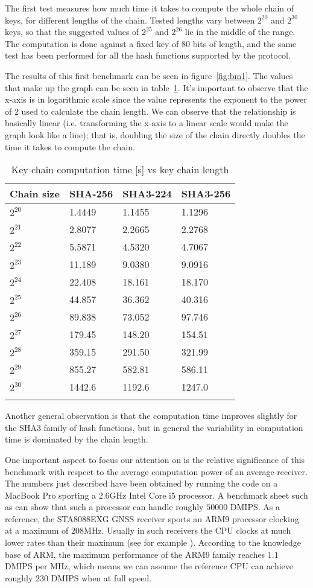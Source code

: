 \vspace{\baselineskip}

The first test measures how much time it takes to compute the whole chain of
keys, for different lengths of the chain. Tested lengths vary between $2^{20}$
and $2^{30}$ keys, so that the suggested values of $2^{25}$ and $2^{26}$ lie in
the middle of the range. The computation is done against a fixed key of $80$
bits of length, and the same test has been performed for all the hash functions
supported by the protocol.


The results of this first benchmark can be seen in figure~\ref{fig:bm1}. The values
that make up the graph can be seen in table~\ref{table:bm1}. It's important to
observe that the x-axis is in logarithmic scale since the value represents the
exponent to the power of $2$ used to calculate the chain length.  We can observe
that the relationship is basically linear (i.e. transforming the x-axis to a
linear scale would make the graph look like a line); that is, doubling the size
of the chain directly doubles the time it takes to compute the chain.

\begin{longtable}[]{@{}llll@{}}
\toprule
Chain size & SHA-256 & SHA3-224 & SHA3-256\tabularnewline
\midrule
\endhead
$2^{20}$ & 1.4449 & 1.1455 & 1.1296\tabularnewline
$2^{21}$ & 2.8077 & 2.2665 & 2.2768\tabularnewline
$2^{22}$ & 5.5871 & 4.5320 & 4.7067\tabularnewline
$2^{23}$ & 11.189 & 9.0380 & 9.0916\tabularnewline
$2^{24}$ & 22.408 & 18.161 & 18.170\tabularnewline
$2^{25}$ & 44.857 & 36.362 & 40.316\tabularnewline
$2^{26}$ & 89.838 & 73.052 & 97.746\tabularnewline
$2^{27}$ & 179.45 & 148.20 & 154.51\tabularnewline
$2^{28}$ & 359.15 & 291.50 & 321.99\tabularnewline
$2^{29}$ & 855.27 & 582.81 & 586.11\tabularnewline
$2^{30}$ & 1442.6 & 1192.6 & 1247.0\tabularnewline
\bottomrule
\caption{Key chain computation time [s] vs key chain length}
\label{table:bm1}
\end{longtable}

Another general observation is that the computation time improves slightly for
the SHA3 family of hash functions, but in general the variability in computation
time is dominated by the chain length.

One important aspect to focus our attention on is the relative significance of
this benchmark with respect to the average computation power of an average
receiver. The numbers just described have been obtained by running the code on a
MacBook Pro sporting a 2.6GHz Intel Core i5 processor. A benchmark sheet such as
\cite{bm_intel_core_i5} can show that such a processor can handle roughly $50
000$ DMIPS. As a reference, the STA8088EXG GNSS receiver \cite{st_rec_specs}
sports an ARM9 processor clocking at a maximum of 208MHz. Usually in such
receivers the CPU clocks at much lower rates than their maximum (see for example
\cite{mediatek_specs}). According to the knowledge base of ARM, the maximum
performance of the ARM9 family reaches $1.1$ DMIPS per MHz, which means we can
assume the reference CPU can achieve roughly $230$ DMIPS when at full speed.

